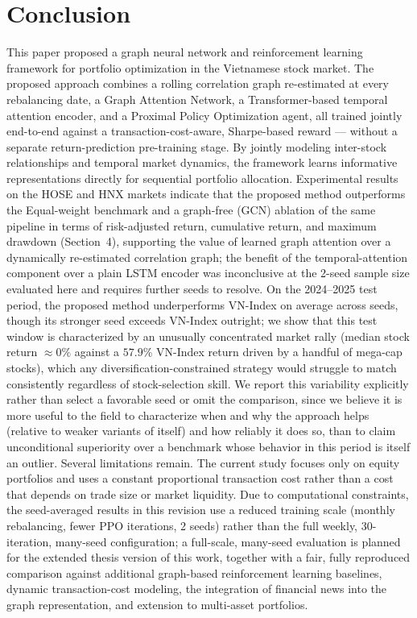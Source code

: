\documentclass[runningheads]{llncs}
\begin{document}
\section{Conclusion}

This paper proposed a graph neural network and reinforcement learning framework for portfolio optimization in the Vietnamese stock market. The proposed approach combines a rolling correlation graph re-estimated at every rebalancing date, a Graph Attention Network, a Transformer-based temporal attention encoder, and a Proximal Policy Optimization agent, all trained jointly end-to-end against a transaction-cost-aware, Sharpe-based reward --- without a separate return-prediction pre-training stage. By jointly modeling inter-stock relationships and temporal market dynamics, the framework learns informative representations directly for sequential portfolio allocation. Experimental results on the HOSE and HNX markets indicate that the proposed method outperforms the Equal-weight benchmark and a graph-free (GCN) ablation of the same pipeline in terms of risk-adjusted return, cumulative return, and maximum drawdown (Section~4), supporting the value of learned graph attention over a dynamically re-estimated correlation graph; the benefit of the temporal-attention component over a plain LSTM encoder was inconclusive at the 2-seed sample size evaluated here and requires further seeds to resolve. On the 2024--2025 test period, the proposed method underperforms VN-Index on average across seeds, though its stronger seed exceeds VN-Index outright; we show that this test window is characterized by an unusually concentrated market rally (median stock return $\approx 0\%$ against a $57.9\%$ VN-Index return driven by a handful of mega-cap stocks), which any diversification-constrained strategy would struggle to match consistently regardless of stock-selection skill. We report this variability explicitly rather than select a favorable seed or omit the comparison, since we believe it is more useful to the field to characterize when and why the approach helps (relative to weaker variants of itself) and how reliably it does so, than to claim unconditional superiority over a benchmark whose behavior in this period is itself an outlier. Several limitations remain. The current study focuses only on equity portfolios and uses a constant proportional transaction cost rather than a cost that depends on trade size or market liquidity. Due to computational constraints, the seed-averaged results in this revision use a reduced training scale (monthly rebalancing, fewer PPO iterations, 2 seeds) rather than the full weekly, 30-iteration, many-seed configuration; a full-scale, many-seed evaluation is planned for the extended thesis version of this work, together with a fair, fully reproduced comparison against additional graph-based reinforcement learning baselines, dynamic transaction-cost modeling, the integration of financial news into the graph representation, and extension to multi-asset portfolios.


\end{document}
